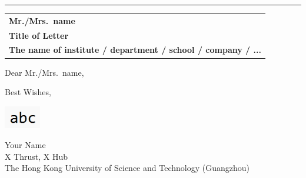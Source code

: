 \documentclass{article}
\begin{document}
\vspace{-1em} %

\rule{\linewidth}{1pt} %

\bigskip\bigskip %

\begin{tabular}{@{} l}
	\textbf{Mr./Mrs.\ name} \\
	\textbf{Title of Letter} \\
	\textbf{The name of institute / department / school / company / ...} \\
\end{tabular}

\bigskip %

Dear Mr./Mrs.\ name,

\bigskip %

\blindtext %

\bigskip %

Best Wishes,

\includegraphics[height = 1cm]{signature.png}

Your Name \\%
X Thrust, X Hub\\
The Hong Kong University of Science and Technology (Guangzhou)
\end{document}
